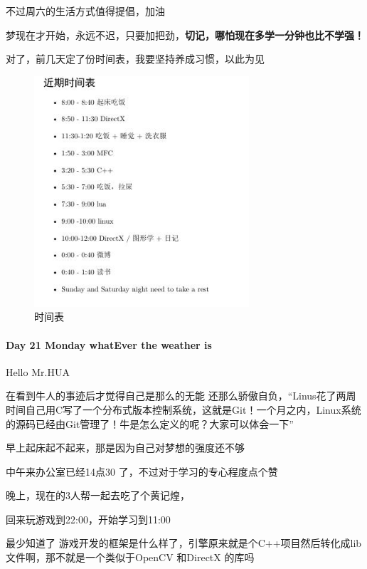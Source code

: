 \documentclass[UTF8,a4paper,8pt]{ctexart}
\begin{document}
        不过周六的生活方式值得提倡，加油
        
        梦现在才开始，永远不迟，只要加把劲，\textbf{切记，哪怕现在多学一分钟也比不学强！}
        
        对了，前几天定了份时间表，我要坚持养成习惯，以此为见
        
       \begin{figure}[h]
       	\centering
       			\includegraphics[angle=0,width=8cm]{Schedule.jpg}%
       			\caption{时间表}
       			\label{fig:schedule}
       		\end{figure}%
       		
       \paragraph{Day 21 Monday  \quad  whatEver the weather is}
       
       Hello Mr.HUA
       
       在看到牛人的事迹后才觉得自己是那么的无能 还那么骄傲自负，“Linus花了两周时间自己用C写了一个分布式版本控制系统，这就是Git！一个月之内，Linux系统的源码已经由Git管理了！牛是怎么定义的呢？大家可以体会一下”
       
       早上起床起不起来，那是因为自己对梦想的强度还不够
       
       中午来办公室已经14点30 了，不过对于学习的专心程度点个赞
       
       晚上，现在的3人帮一起去吃了个黄记煌，
       
       回来玩游戏到22:00，开始学习到11:00
       
       最少知道了 游戏开发的框架是什么样了，引擎原来就是个C++项目然后转化成lib文件啊，那不就是一个类似于OpenCV 和DirectX 的库吗
       
\end{document}
